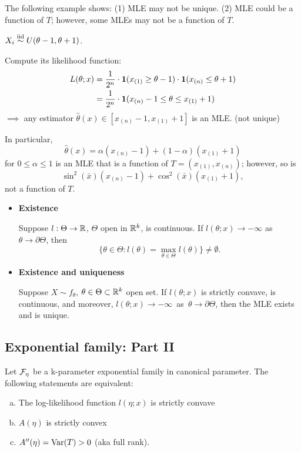 The following example shows: (1) MLE may not be unique. (2) MLE could be a function of $T$; however, some MLEs may not be a function of $T$.
\begin{exap}
	$X_i \stackrel{\text{iid}}{\sim} U(\theta-1, \theta+1)$.
	
	Compute its likelihood function:
	\begin{align*}
		L(\theta; x) &= \frac{1}{2^n} \cdot \boldsymbol{1}(x_{(1)} \geq \theta -1 ) \cdot \boldsymbol{1} (x_{(n)} \leq \theta+1)\\
		&= \frac{1}{2^n} \cdot \boldsymbol{1}(x_{(n)} - 1 \leq \theta \leq  x_{(1)} + 1)
	\end{align*}
	 $\implies$ any estimator $\hat{\theta}(x) \in [x_{(n)} - 1, x_{(1)} + 1]$ is an MLE. (not unique)
	
	In particular, 
	$$\hat{\theta}(x) = \alpha (x_{(n)} - 1) + (1 -\alpha) (x_{(1)} + 1)$$
	for $0\leq \alpha \leq 1$ is an MLE that is a function of $T = (x_{(1)}, x_{(n)})$; however, so is 
	$$\sin^2(\bar{x}) (x_{(n)} - 1)+ \cos^2(\bar{x}) (x_{(1)} + 1) ,$$
	not a function of $T$.
\end{exap}
\begin{thm}
	\textbf{ }
	
	\begin{itemize}
		\item \textbf{Existence}
		
		Suppose $l: \Theta \to \mathbb{R}$, $\Theta$ open in $\mathbb{R}^k$, is continuous. If  $l(\theta;x) \to -\infty$ as $\theta \to \partial \Theta$, then 
		$$\{ \theta \in \Theta: l(\theta) = \max_{\theta \in \Theta} l(\theta)  \} \neq \emptyset.$$
		
		\item \textbf{Existence and uniqueness}
		
		Suppose $X \sim f_\theta$, $\theta \in \Theta \subset \mathbb{R}^k$ open set. If $l(\theta;x)$ is strictly convave, is continuous, and moreover, $l(\theta;x) \longrightarrow -\infty$~as~$\theta \to \partial \Theta$, then the MLE exists and is unique. 
	\end{itemize}
	
\end{thm} 

\subsection{Exponential family: Part II}
\begin{lem}
	Let $\mathcal{F}_\eta$ be a k-parameter exponential family in canonical parameter. The following statements are equivalent:
	\begin{enumerate}[a)]
		\item The log-likelihood function $l(\eta; x)$ is strictly convave 
		\item $A(\eta)$ is strictly convex
		\item $A''(\eta) = \mathrm{Var}(T) > 0$ (aka full rank).
	\end{enumerate}
\end{lem}

